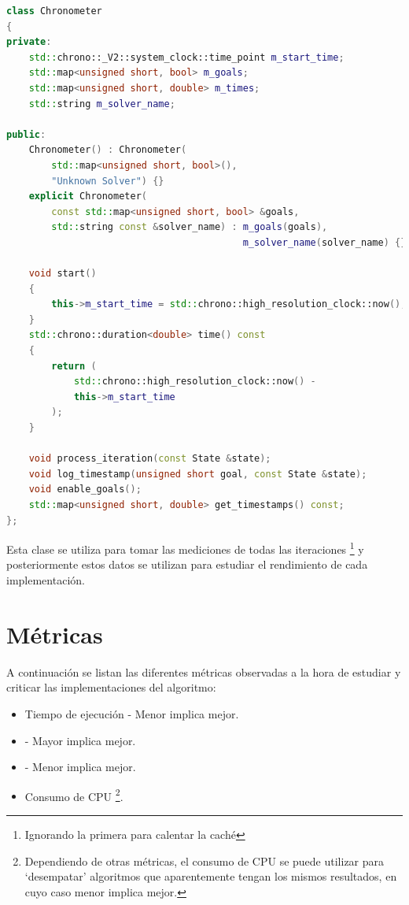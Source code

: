 \begin{lstlisting}[language=C++]
class Chronometer
{
private:
    std::chrono::_V2::system_clock::time_point m_start_time;
    std::map<unsigned short, bool> m_goals;
    std::map<unsigned short, double> m_times;
    std::string m_solver_name;

public:
    Chronometer() : Chronometer(
        std::map<unsigned short, bool>(),
        "Unknown Solver") {}
    explicit Chronometer(
        const std::map<unsigned short, bool> &goals,
        std::string const &solver_name) : m_goals(goals),
                                          m_solver_name(solver_name) {}

    void start()
    {
        this->m_start_time = std::chrono::high_resolution_clock::now();
    }
    std::chrono::duration<double> time() const
    {
        return (
            std::chrono::high_resolution_clock::now() -
            this->m_start_time
        );
    }

    void process_iteration(const State &state);
    void log_timestamp(unsigned short goal, const State &state);
    void enable_goals();
    std::map<unsigned short, double> get_timestamps() const;
};
\end{lstlisting}

Esta clase se utiliza para tomar las mediciones de todas las iteraciones
\footnote{Ignorando la primera para calentar la caché}
y posteriormente estos datos se utilizan para estudiar
el rendimiento de cada implementación.

\pagebreak

\section{Métricas}

A continuación se listan las diferentes métricas observadas a la hora
de estudiar y criticar las implementaciones del algoritmo:
\begin{itemize}[itemsep=0.25px]
    \item Tiempo de ejecución - Menor implica mejor.
    \item {} - Mayor implica mejor.
    \item {} - Menor implica mejor.
    \item Consumo de CPU \footnote{
        Dependiendo de otras métricas, el consumo de CPU se
        puede utilizar para `desempatar' algoritmos que
        aparentemente tengan los mismos resultados,
        en cuyo caso menor implica mejor.
    }.
\end{itemize}

